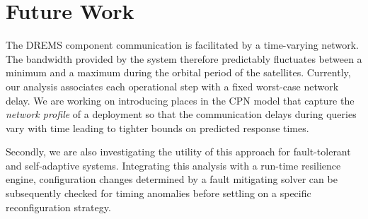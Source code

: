 \section{Future Work}
\label{sec:Future_Work}

The DREMS component communication is facilitated by a time-varying network. The bandwidth provided by the system therefore predictably fluctuates between a minimum and a maximum during the orbital period of the satellites. Currently, our analysis associates each operational step with a fixed worst-case network delay. We are working on introducing places in the CPN model that capture the \emph{network profile} of a deployment so that the communication delays during queries vary with time leading to tighter bounds on predicted response times.   

Secondly, we are also investigating the utility of this approach for fault-tolerant and self-adaptive systems. Integrating this analysis with a run-time resilience engine, configuration changes determined by a fault mitigating solver can be subsequently checked for timing anomalies before settling on a specific reconfiguration strategy. 